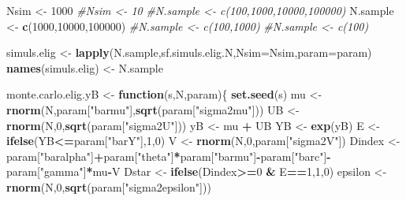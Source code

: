 \documentclass[]{book}
\newenvironment{Shaded}{\begin{snugshade}}{\end{snugshade}}
\newcommand{\CommentTok}[1]{\textcolor[rgb]{0.56,0.35,0.01}{\textit{#1}}}
\newcommand{\ControlFlowTok}[1]{\textcolor[rgb]{0.13,0.29,0.53}{\textbf{#1}}}
\newcommand{\DataTypeTok}[1]{\textcolor[rgb]{0.13,0.29,0.53}{#1}}
\newcommand{\DecValTok}[1]{\textcolor[rgb]{0.00,0.00,0.81}{#1}}
\newcommand{\KeywordTok}[1]{\textcolor[rgb]{0.13,0.29,0.53}{\textbf{#1}}}
\newcommand{\NormalTok}[1]{#1}
\newcommand{\OperatorTok}[1]{\textcolor[rgb]{0.81,0.36,0.00}{\textbf{#1}}}
\newcommand{\StringTok}[1]{\textcolor[rgb]{0.31,0.60,0.02}{#1}}
\theoremstyle{definition}
\theoremstyle{definition}
\theoremstyle{definition}
\theoremstyle{remark}
\begin{document}
\begin{Shaded}
\begin{Highlighting}[]
\NormalTok{Nsim <-}\StringTok{ }\DecValTok{1000}
\CommentTok{#Nsim <- 10}
\CommentTok{#N.sample <- c(100,1000,10000,100000)}
\NormalTok{N.sample <-}\StringTok{ }\KeywordTok{c}\NormalTok{(}\DecValTok{1000}\NormalTok{,}\DecValTok{10000}\NormalTok{,}\DecValTok{100000}\NormalTok{)}
\CommentTok{#N.sample <- c(100,1000)}
\CommentTok{#N.sample <- c(100)}

\NormalTok{simuls.elig <-}\StringTok{ }\KeywordTok{lapply}\NormalTok{(N.sample,sf.simuls.elig.N,}\DataTypeTok{Nsim=}\NormalTok{Nsim,}\DataTypeTok{param=}\NormalTok{param)}
\KeywordTok{names}\NormalTok{(simuls.elig) <-}\StringTok{ }\NormalTok{N.sample}
\end{Highlighting}
\end{Shaded}

\begin{Shaded}
\begin{Highlighting}[]
\NormalTok{monte.carlo.elig.yB <-}\StringTok{ }\ControlFlowTok{function}\NormalTok{(s,N,param)\{}
  \KeywordTok{set.seed}\NormalTok{(s)}
\NormalTok{  mu <-}\StringTok{ }\KeywordTok{rnorm}\NormalTok{(N,param[}\StringTok{"barmu"}\NormalTok{],}\KeywordTok{sqrt}\NormalTok{(param[}\StringTok{"sigma2mu"}\NormalTok{]))}
\NormalTok{  UB <-}\StringTok{ }\KeywordTok{rnorm}\NormalTok{(N,}\DecValTok{0}\NormalTok{,}\KeywordTok{sqrt}\NormalTok{(param[}\StringTok{"sigma2U"}\NormalTok{]))}
\NormalTok{  yB <-}\StringTok{ }\NormalTok{mu }\OperatorTok{+}\StringTok{ }\NormalTok{UB }
\NormalTok{  YB <-}\StringTok{ }\KeywordTok{exp}\NormalTok{(yB)}
\NormalTok{  E <-}\StringTok{ }\KeywordTok{ifelse}\NormalTok{(YB}\OperatorTok{<=}\NormalTok{param[}\StringTok{"barY"}\NormalTok{],}\DecValTok{1}\NormalTok{,}\DecValTok{0}\NormalTok{)}
\NormalTok{  V <-}\StringTok{ }\KeywordTok{rnorm}\NormalTok{(N,}\DecValTok{0}\NormalTok{,param[}\StringTok{"sigma2V"}\NormalTok{])}
\NormalTok{  Dindex <-}\StringTok{ }\NormalTok{param[}\StringTok{"baralpha"}\NormalTok{]}\OperatorTok{+}\NormalTok{param[}\StringTok{"theta"}\NormalTok{]}\OperatorTok{*}\NormalTok{param[}\StringTok{"barmu"}\NormalTok{]}\OperatorTok{-}\NormalTok{param[}\StringTok{"barc"}\NormalTok{]}\OperatorTok{-}\NormalTok{param[}\StringTok{"gamma"}\NormalTok{]}\OperatorTok{*}\NormalTok{mu}\OperatorTok{-}\NormalTok{V}
\NormalTok{  Dstar <-}\StringTok{ }\KeywordTok{ifelse}\NormalTok{(Dindex}\OperatorTok{>=}\DecValTok{0} \OperatorTok{&}\StringTok{ }\NormalTok{E}\OperatorTok{==}\DecValTok{1}\NormalTok{,}\DecValTok{1}\NormalTok{,}\DecValTok{0}\NormalTok{)}
\NormalTok{  epsilon <-}\StringTok{ }\KeywordTok{rnorm}\NormalTok{(N,}\DecValTok{0}\NormalTok{,}\KeywordTok{sqrt}\NormalTok{(param[}\StringTok{"sigma2epsilon"}\NormalTok{]))}

\end{Highlighting}
\end{Shaded}
\end{document}
